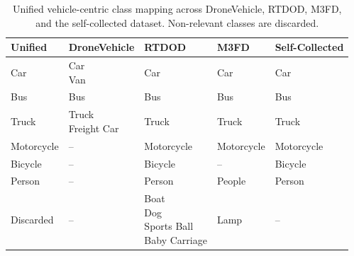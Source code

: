 \documentclass[12pt,oneside,bibtotoc,liststotoc]{scrbook}
\begin{document}
\begin{table}[H]
    \scriptsize
    \centering
    \begin{tabular}{|>{\centering\arraybackslash}p{2.2cm}>{\centering\arraybackslash}p{2.6cm}>{\centering\arraybackslash}p{2.6cm}>{\centering\arraybackslash}p{2.2cm}>{\centering\arraybackslash}p{2.2cm}|}
        \toprule
        \rowcolor{white}
        \textbf{Unified} & \textbf{DroneVehicle} & \textbf{RTDOD} & \textbf{M3FD} & \textbf{Self-Collected} \\
        \midrule
        Car              & \makecell[tc]{Car                                                                \\ Van} & Car & Car & Car \\
        Bus              & Bus                   & Bus            & Bus           & Bus                     \\
        Truck            & \makecell[tc]{Truck                                                              \\ Freight Car} & Truck & Truck & Truck \\
        Motorcycle       & --                    & Motorcycle     & Motorcycle    & Motorcycle              \\
        Bicycle          & --                    & Bicycle        & --            & Bicycle                 \\
        Person           & --                    & Person         & People        & Person                  \\
        Discarded        & --                    &
        \makecell[tc]{Boat                                                                                  \\  Dog \\  Sports Ball \\  Baby Carriage}
                         & Lamp                  & --                                                       \\
        \bottomrule
    \end{tabular}
    \caption{Unified vehicle-centric class mapping across DroneVehicle, RTDOD, M3FD, and the self-collected dataset. Non-relevant classes are discarded.}
    \label{tab:dataset_class_merge}
\end{table}
\end{document}
